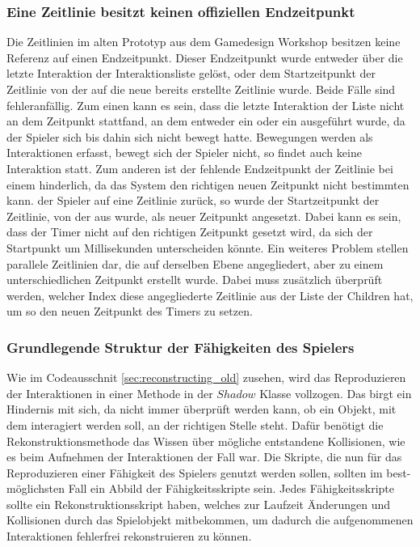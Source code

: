 \subsubsection{Eine Zeitlinie besitzt keinen offiziellen Endzeitpunkt}
Die Zeitlinien im alten Prototyp aus dem Gamedesign Workshop besitzen keine Referenz auf einen Endzeitpunkt. Dieser Endzeitpunkt wurde entweder über die letzte Interaktion der Interaktionsliste gelöst, oder dem Startzeitpunkt der Zeitlinie von der auf die neue bereits erstellte Zeitlinie  wurde. Beide Fälle sind fehleranfällig. Zum einen kann es sein, dass die letzte Interaktion der Liste nicht an dem Zeitpunkt stattfand, an dem entweder ein  oder ein  ausgeführt wurde, da der Spieler sich bis dahin sich nicht bewegt hatte. Bewegungen werden als Interaktionen erfasst, bewegt sich der Spieler nicht, so findet auch keine Interaktion statt. Zum anderen ist der fehlende Endzeitpunkt der Zeitlinie bei einem  hinderlich, da das System den richtigen neuen Zeitpunkt nicht bestimmten kann.  der Spieler auf eine Zeitlinie zurück, so wurde der Startzeitpunkt der Zeitlinie, von der aus  wurde, als neuer Zeitpunkt angesetzt. Dabei kann es sein, dass der Timer nicht auf den richtigen Zeitpunkt gesetzt wird, da sich der Startpunkt um Millisekunden unterscheiden könnte. Ein weiteres Problem stellen parallele Zeitlinien dar, die auf derselben Ebene angegliedert, aber zu einem unterschiedlichen Zeitpunkt erstellt wurde. Dabei muss zusätzlich überprüft werden, welcher Index diese angegliederte Zeitlinie aus der Liste der Children hat, um so den neuen Zeitpunkt des Timers zu setzen.

\subsubsection{Grundlegende Struktur der Fähigkeiten des Spielers}
Wie im Codeausschnit \ref{sec:reconstructing_old} zusehen, wird das Reproduzieren der Interaktionen in einer Methode in der $Shadow$ Klasse vollzogen. Das birgt ein Hindernis mit sich, da nicht immer überprüft werden kann, ob ein Objekt, mit dem interagiert werden soll, an der richtigen Stelle steht. Dafür benötigt die Rekonstruktionsmethode das Wissen über mögliche entstandene Kollisionen, wie es beim Aufnehmen der Interaktionen der Fall war. Die Skripte, die nun für das Reproduzieren einer Fähigkeit des Spielers genutzt werden sollen, sollten im best-möglichsten Fall ein Abbild der Fähigkeitsskripte sein. Jedes Fähigkeitsskripte sollte ein Rekonstruktionsskript haben, welches zur Laufzeit Änderungen und Kollisionen durch das Spielobjekt mitbekommen, um dadurch die aufgenommenen Interaktionen fehlerfrei rekonstruieren zu können.

